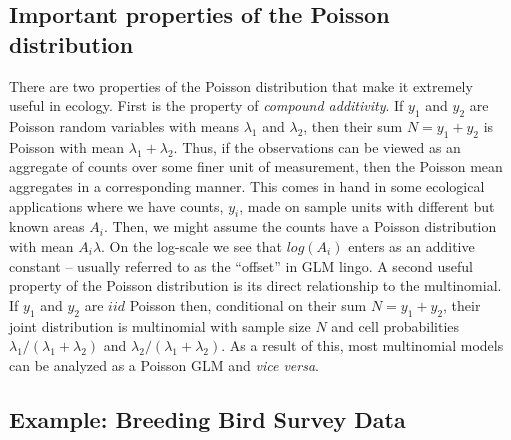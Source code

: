 \subsection{Important properties of the Poisson distribution}
\label{glms.sec.properties}

There are two properties of the Poisson distribution
that make it extremely useful in ecology. First
is the property of {\it compound additivity}. If $y_1$ and $y_2$ are
Poisson random variables with means $\lambda_1$ and $\lambda_2$,
then their sum $N=y_1+y_2$ is Poisson with mean $\lambda_1+\lambda_2$. Thus,
if the observations can be viewed as an aggregate of counts over some
finer unit of measurement, then the Poisson mean aggregates in a corresponding
manner. This comes in hand in some ecological applications
where we have counts, $y_{i}$, made on sample units with different but known areas $A_{i}$. 
Then, we might assume 
the counts have a Poisson distribution with mean $A_{i}\lambda$. On the log-scale we see that 
$log(A_{i})$ enters as an additive constant -- usually referred to as the ``offset'' in GLM
lingo. 
A second useful property of the Poisson distribution is its
direct relationship to the multinomial.
If $y_1$ and $y_2$ are $iid$ Poisson then,
conditional on their sum $N = y_1 + y_2$, their joint distribution is multinomial
 with sample size $N$ and cell probabilities
$\lambda_1/(\lambda_1+\lambda_2)$ and
$\lambda_2/(\lambda_1+\lambda_2)$.  As a result of this, most
multinomial models can be analyzed as a Poisson GLM and {\it vice versa}.

\subsection{Example: Breeding Bird Survey Data}

